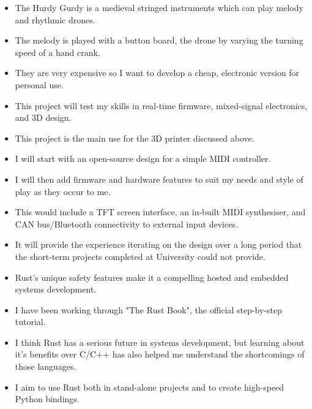 {
  {\begin{itemize}
    \item The Hurdy Gurdy is a medieval stringed instruments which can play melody and rhythmic drones.
    \item The melody is played with a button board, the drone by varying the turning speed of a hand crank.  
    \item They are very expensive so I want to develop a cheap, electronic version for personal use.
    \item This project will test my skills in real-time firmware, mixed-signal electronics, and 3D design. 
    \item This project is the main use for the 3D printer discussed above.
    \item I will start with an open-source design for a simple MIDI controller.
    \item I will then add firmware and hardware features to suit my needs and style of play as they occur to me. 
    \item This would include a TFT screen interface, an in-built MIDI synthesiser, and CAN bus/Bluetooth connectivity to external input devices.
    \item It will provide the experience iterating on the design over a long period that the short-term projects completed at University could not provide.
  \end{itemize}
  }
}

{
  {\begin{itemize}
    \item Rust's unique safety features make it a compelling hosted and embedded systems development.
    \item I have been working through "The Rust Book", the official step-by-step tutorial.
    \item I think Rust has a serious future in systems development, but learning about it's benefits over C/C++ has also helped me understand the shortcomings of those languages.
    \item I aim to use Rust both in stand-alone projects and to create high-speed Python bindings. 
  \end{itemize}
  }
}

